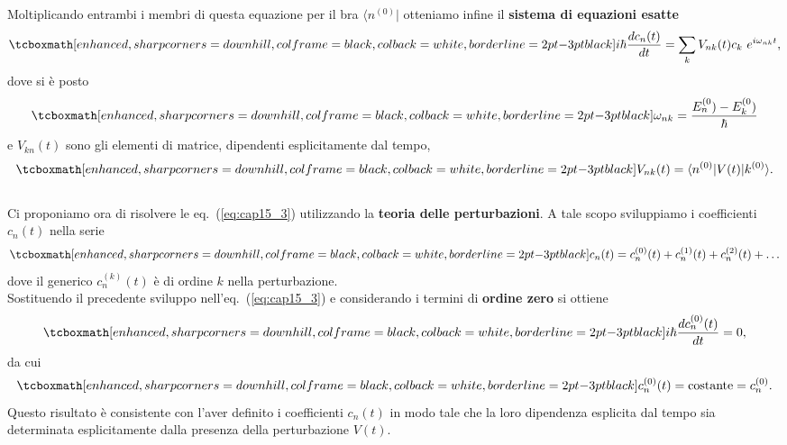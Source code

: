 \documentclass[a4paper,12pt,oneside]{book}
\begin{document}
Moltiplicando entrambi i membri di questa equazione per il bra $\langle n^{(0)} \vert$ otteniamo infine il \textbf{sistema di equazioni esatte}
	\begin{equation}
		\tcboxmath[enhanced, sharp corners=downhill, colframe=black, colback=white, borderline={2pt}{-3pt}{black}]{
			i\hbar \frac{dc_n (t)}{dt} = \sum _ k V_{nk} (t) c_k\ e^{i\omega _{nk}t } ,
			}
	\label{eq:cap15_3}
	\end{equation}
dove si è posto
	\begin{equation}
		\tcboxmath[enhanced, sharp corners=downhill, colframe=black, colback=white, borderline={2pt}{-3pt}{black}]{
			\omega _{nk} = \frac{E_n ^{(0})-E_k ^{(0})}{\hbar}
			}
	\end{equation}
e $V_{kn} (t)$ sono gli elementi di matrice, dipendenti esplicitamente dal tempo,
	\begin{equation}
		\tcboxmath[enhanced, sharp corners=downhill, colframe=black, colback=white, borderline={2pt}{-3pt}{black}]{
			V_{nk} (t) = \langle n ^{(0)} \vert V(t) \vert k ^{(0)} \rangle .
			}
	\end{equation}\\
	
Ci proponiamo ora di risolvere le eq.~(\ref{eq:cap15_3}) utilizzando la \textbf{teoria delle perturbazioni}. A tale scopo sviluppiamo i coefficienti $c_n (t)$ nella serie
	\begin{equation}
		\tcboxmath[enhanced, sharp corners=downhill, colframe=black, colback=white, borderline={2pt}{-3pt}{black}]{
			c_n (t) = c_n ^{(0)}(t)+c_n ^{(1)}(t)+c_n ^{(2)}(t)+\dots
			}
	\end{equation}
dove il generico $c_n ^{(k)}(t)$ è di ordine $k$ nella perturbazione.\\

Sostituendo il precedente sviluppo nell'eq.~(\ref{eq:cap15_3}) e considerando i termini di \textbf{ordine zero} si ottiene
	\begin{equation}
		\tcboxmath[enhanced, sharp corners=downhill, colframe=black, colback=white, borderline={2pt}{-3pt}{black}]{
			i\hbar \frac{d c_n ^{(0)}(t)}{dt}=0 ,
			}
	\end{equation}
da cui
	\begin{equation}
		\tcboxmath[enhanced, sharp corners=downhill, colframe=black, colback=white, borderline={2pt}{-3pt}{black}]{
			c_n ^{(0)}(t) = \textrm{costante}= c_n ^{(0)} .
			}
	\label{eq:cap15_4}
	\end{equation}
Questo risultato è consistente con l'aver definito i coefficienti $c_n (t)$ in modo tale che la loro dipendenza esplicita dal tempo sia determinata esplicitamente dalla presenza della perturbazione $V(t)$.\\
\end{document}
